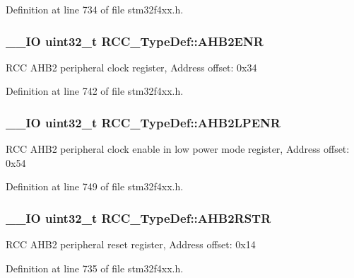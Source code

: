 Definition at line 734 of file stm32f4xx.\-h.

\hypertarget{struct_r_c_c___type_def_af326cb98c318fc08894a8dd79c2c675f}{
\subsubsection[{A\-H\-B2\-E\-N\-R}]{\setlength{\rightskip}{0pt plus 5cm}\-\_\-\-\_\-\-I\-O {\bf uint32\-\_\-t} R\-C\-C\-\_\-\-Type\-Def\-::\-A\-H\-B2\-E\-N\-R}}\label{struct_r_c_c___type_def_af326cb98c318fc08894a8dd79c2c675f}
R\-C\-C A\-H\-B2 peripheral clock register, Address offset\-: 0x34 

Definition at line 742 of file stm32f4xx.\-h.

\hypertarget{struct_r_c_c___type_def_a1de344446cba3f4dd15c56fbe20eb0dd}{
\subsubsection[{A\-H\-B2\-L\-P\-E\-N\-R}]{\setlength{\rightskip}{0pt plus 5cm}\-\_\-\-\_\-\-I\-O {\bf uint32\-\_\-t} R\-C\-C\-\_\-\-Type\-Def\-::\-A\-H\-B2\-L\-P\-E\-N\-R}}\label{struct_r_c_c___type_def_a1de344446cba3f4dd15c56fbe20eb0dd}
R\-C\-C A\-H\-B2 peripheral clock enable in low power mode register, Address offset\-: 0x54 

Definition at line 749 of file stm32f4xx.\-h.

\hypertarget{struct_r_c_c___type_def_a343e0230ded55920ff2a04fbde0e5bcd}{
\subsubsection[{A\-H\-B2\-R\-S\-T\-R}]{\setlength{\rightskip}{0pt plus 5cm}\-\_\-\-\_\-\-I\-O {\bf uint32\-\_\-t} R\-C\-C\-\_\-\-Type\-Def\-::\-A\-H\-B2\-R\-S\-T\-R}}\label{struct_r_c_c___type_def_a343e0230ded55920ff2a04fbde0e5bcd}
R\-C\-C A\-H\-B2 peripheral reset register, Address offset\-: 0x14 

Definition at line 735 of file stm32f4xx.\-h.

